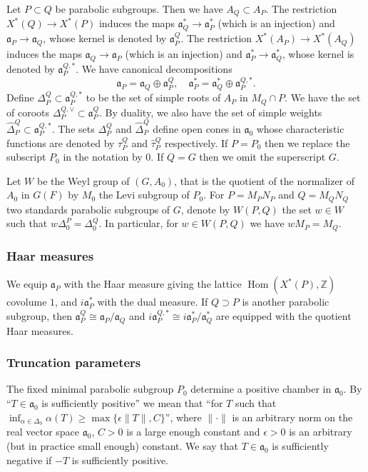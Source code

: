 \documentclass[letterpaper,11pt]{amsart}
\newcommand{\fa}{\mathfrak{a}}
\newcommand{\Z}{\mathbb{Z}}
\newcommand{\<}{\negthickspace}
\providecommand{\aabs}[1]{\lVert#1\rVert}
\DeclareMathOperator{\Hom}{Hom}
\theoremstyle{definition}
\theoremstyle{plain}
\theoremstyle{remark}
\numberwithin{equation}{section}
\begin{document}
Let $P \subset Q$ be parabolic subgroups. Then we have $A_Q \subset A_P$. The restriction $X^*(Q) \to X^*(P)$ induces
the maps $\fa_Q^* \to \fa_P^*$ (which is an injection) and $\fa_P \to \fa_Q$, whose kernel is denoted by $\fa_P^{Q}$. The restriction $X^*(A_P) \to X^*(A_Q)$ induces the maps $\fa_Q \to \fa_P$ (which is an injection) and $\fa_P^* \to \fa_Q^*$, whose kernel is denoted by $\fa_P^{Q, *}$. We have canonical
decompositions
    \[
    \fa_P = \fa_Q \oplus \fa_P^Q, \quad  \fa_P^* = \fa_Q^* \oplus \fa_P^{Q, *}.
    \]
Define $\Delta_P^Q \subset \fa_P^{Q, *}$ to be the set of simple roots of
$A_P$ in $M_Q \cap P$. We have the set of coroots $\Delta_P^{Q, \vee} \subset
\fa_P^Q$. By duality, we also have the set of simple weights
$\widehat{\Delta}_P^Q \subset \fa_P^{Q, *}$. The sets $\Delta_P^Q$ and
$\widehat{\Delta}_P^Q$ define open cones in $\fa_0$ whose characteristic
functions are denoted by $\tau_P^Q$ and $\widehat{\tau}_P^Q$ respectively. If
$P = P_0$ then we replace the subscript $P_0$ in the notation by $0$. If $Q =
G$ then we omit the superscript $G$.

Let $W$ be the Weyl group of $(G,A_0)$, that is the quotient of the normalizer of $A_0$ in $G(F)$ by $M_0$ the Levi subgroup of $P_0$. For $P=M_P N_P$ and $Q=M_Q N_Q$ two standards parabolic subgroups of $G$, denote by $W(P,Q)$ the set $w \in W$ such that $w \Delta_0^P=\Delta_0^Q$. In particular, for $w \in W(P,Q)$ we have $wM_P=M_Q$.

\subsubsection{Haar measures}
\label{subsubsec:measures_Lie}
We equip $\fa_P$ with the Haar measure
giving the lattice $\Hom(X^*(P),\Z)$ covolume $1$, and $i\fa_P^*$ with the
dual measure. If $Q \supset P$ is another parabolic subgroup, then $\fa_P^Q
\cong \fa_P / \fa_Q$ and $i\fa_P^{Q,*} \cong i\fa_P^* / \fa_Q^*$ are equipped
with the quotient Haar measures.

\subsubsection{Truncation parameters}

The fixed minimal parabolic subgroup $P_0$ determine a positive chamber in
$\fa_0$. By ``$T \in \fa_0$ is sufficiently positive'' we mean that ``for $T$
such that $\inf_{\alpha \in \Delta_0} \alpha(T) \geq \max\{\epsilon \aabs{T},
C\}$'', where $\aabs{\cdot}$ is an arbitrary norm on the real vector space
$\fa_0$, $C> 0$ is a large enough constant and $\epsilon>0$ is an arbitrary
(but in practice small enough) constant. We say that $T \in \fa_0$ is sufficiently
negative if $-T$ is sufficiently positive.
\end{document}
